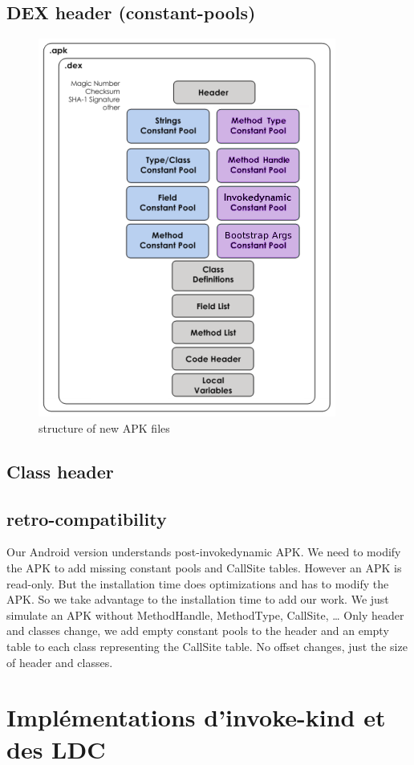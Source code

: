 \documentclass{sigplanconf}
\def \ANDROID{\mbox{Android}\xspace}
\begin{document}
  \subsection{DEX header (constant-pools)}
  
    \begin{figure}[h]
      \centering \includegraphics[width=.5\columnwidth]{structure-apk-292.png}
      \caption{structure of new APK files}
      \label{SNA}
    \end{figure}

  \subsection{Class header}
  \subsection{retro-compatibility}
    Our \ANDROID version understands post-invokedynamic APK.
    We need to modify the APK to add missing constant pools and CallSite tables.
    However an APK is read-only.
    But the installation time does optimizations and has to modify the APK.
    So we take advantage to the installation time to add our work.
    We just simulate an APK without MethodHandle, MethodType, CallSite, \dots
    Only header and classes change, we add empty constant pools to the header
    and an empty table to each class representing the CallSite table.
    No offset changes, just the size of header and classes.

\section{Impl\'ementations d'invoke-kind et des LDC}
\end{document}
